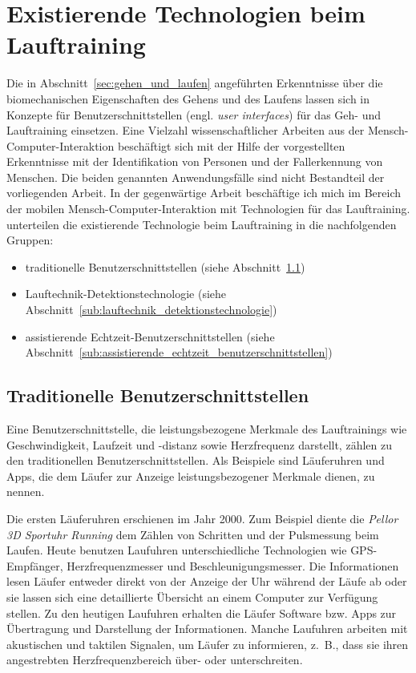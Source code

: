 \section{Existierende Technologien beim Lauftraining}
\label{sec:existierende_technologien_beim_lauftraining}

Die in Abschnitt~\ref{sec:gehen_und_laufen} angeführten Erkenntnisse über die biomechanischen Eigenschaften des Gehens und des Laufens lassen sich in Konzepte für Benutzerschnittstellen (engl. \emph{user interfaces}) für das Geh- und Lauftraining einsetzen. Eine Vielzahl wissenschaftlicher Arbeiten aus der Mensch-Computer-Interaktion beschäftigt sich mit der Hilfe der vorgestellten Erkenntnisse mit der Identifikation von Personen und der Fallerkennung von Menschen. Die beiden genannten Anwendungsfälle sind nicht Bestandteil der vorliegenden Arbeit. In der gegenwärtige Arbeit beschäftige ich mich im Bereich der mobilen Mensch-Computer-Interaktion mit Technologien für das Lauftraining. \citet{Jensen2014} unterteilen die existierende Technologie beim Lauftraining in die nachfolgenden Gruppen:

\begin{itemize}
\item traditionelle Benutzerschnittstellen (siehe Abschnitt~\ref{sub:traditionelle_benutzerschnittstellen})
\item Lauftechnik-Detektionstechnologie (siehe Abschnitt~\ref{sub:lauftechnik_detektionstechnologie})
\item assistierende Echtzeit-Benutzerschnittstellen (siehe Abschnitt~\ref{sub:assistierende_echtzeit_benutzerschnittstellen})
\end{itemize}

\subsection{Traditionelle Benutzerschnittstellen}
\label{sub:traditionelle_benutzerschnittstellen}

Eine Benutzerschnittstelle, die leistungsbezogene Merkmale des Lauftrainings wie Geschwindigkeit, Laufzeit und -distanz sowie Herzfrequenz darstellt, zählen \citet{Jensen2014} zu den traditionellen Benutzerschnittstellen. Als Beispiele sind Läuferuhren und Apps, die dem Läufer zur Anzeige leistungsbezogener Merkmale dienen, zu nennen.

Die ersten Läuferuhren erschienen im Jahr 2000. Zum Beispiel diente die \emph{Pellor 3D Sportuhr Running} dem Zählen von Schritten und der Pulsmessung beim Laufen. Heute benutzen Laufuhren unterschiedliche Technologien wie \ac{GPS}-Empfänger, Herzfrequenzmesser und Beschleunigungsmesser. Die Informationen lesen Läufer entweder direkt von der Anzeige der Uhr während der Läufe ab oder sie lassen sich eine detaillierte Übersicht an einem Computer zur Verfügung stellen. Zu den heutigen Laufuhren erhalten die Läufer Software bzw. Apps zur Übertragung und Darstellung der Informationen. Manche Laufuhren arbeiten mit akustischen und taktilen Signalen, um Läufer zu informieren, z.~B., dass sie ihren angestrebten Herzfrequenzbereich über- oder unterschreiten.

